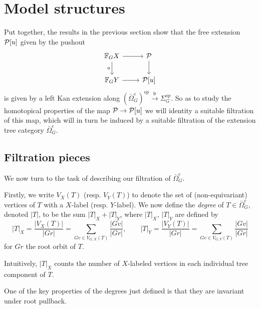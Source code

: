 \documentclass[a4paper,10pt]{article}%
\begin{document}
\newpage



\section{Model structures}

Put together, the results in the previous section show that the free extension $\P[u]$ given by the pushout
\begin{equation}\label{CELLEXTPUSH EQ}
\begin{tikzcd}
  \mathbb F_G X \arrow[d, "u"'] \arrow[r] & \P \arrow[d]\\
  \mathbb F_G Y \arrow[r] & \P[u]
\end{tikzcd}
\end{equation}
is given by a left Kan extension along 
$(\bar{\Omega}_{G}^e)^{op} \xrightarrow{\mathsf{lr}} \Sigma_G^{op}$. So as to study the homotopical properties of the map $\P \to \P[u]$ we will identity a suitable filtration of this map, which will in turn be induced by a suitable filtration of the extension tree category $\bar{\Omega}_{G}^e$.


\subsection{Filtration pieces}

We now turn to the task of describing our filtration of $\bar{\Omega}_{G}^e$. 

Firstly, we write $V_X(T)$ (resp. $V_Y(T)$) to denote the set of (non-equivariant) vertices of $T$ with a $X$-label (resp. $Y$-label). 
We now define the \textit{degree} of $T \in \bar{\Omega}_{G}^e$,
denoted $|T|$, to be the sum $|T|_X + |T|_Y$, where $|T|_X$, $|T|_Y$ are defined by
\[
|T|_X = \dfrac{|V_X(T)|}{|G r|} = \sum\limits_{G v\in V_{G,X}(T)}\dfrac{|G v|}{|G r|},
\qquad
|T|_Y = \dfrac{|V_Y(T)|}{|G r|} = \sum\limits_{G v\in V_{G,Y}(T)}\dfrac{|G v|}{|G r|}
\]
for $G r$ the root orbit of $T$. 

Intuitively, $|T|_X$ counts the number of $X$-labeled vertices in each individual tree component of $T$.


\begin{remark}
	One of the key properties of the degrees just defined is that they are invariant under root pullback.
\end{remark}
\end{document}

